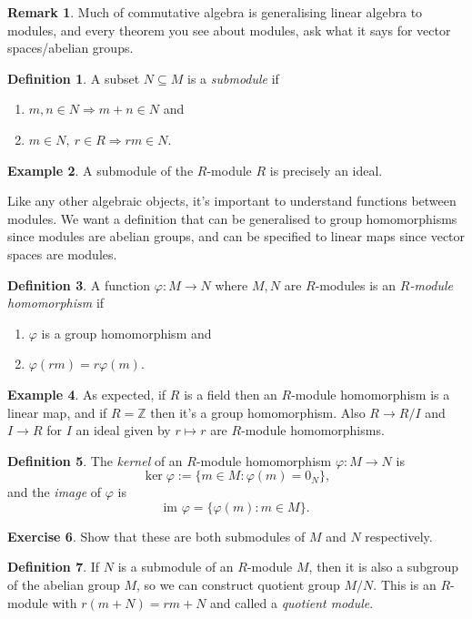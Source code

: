 \documentclass[a4paper]{article}
\newcommand{\Z}{\mathbb Z}
\newcommand{\im}{\text{im }}
\theoremstyle{definition}
\newtheorem{defn}{Definition}[subsection]
\newtheorem{example}[defn]{Example}
\newtheorem{exe}[defn]{Exercise}
\newtheorem*{remark}{Remark}
\begin{document}
\begin{remark}
Much of commutative algebra is generalising linear algebra to modules, and every theorem you see about modules, ask what it says for vector spaces/abelian groups. 
\end{remark}

\begin{defn}
A subset $N\subseteq M$ is a \textit{submodule} if
\begin{enumerate}
\item $m,n\in N\Rightarrow m+n\in N$ and
\item $m\in N,\ r\in R\Rightarrow rm\in N$.
\end{enumerate}
\end{defn}
\begin{example}
A submodule of the $R$-module $R$ is precisely an ideal.
\end{example}
Like any other algebraic objects, it's important to understand functions between modules. We want a definition that can be generalised to group homomorphisms since modules are abelian groups, and can be specified to linear maps since vector spaces are modules.
\begin{defn}
A function $\varphi:M\rightarrow N$ where $M,N$ are $R$-modules is an $R$\textit{-module homomorphism} if
\begin{enumerate}
\item $\varphi$ is a group homomorphism and
\item $\varphi(rm)=r\varphi(m)$.
\end{enumerate}
\end{defn}
\begin{example}
As expected, if $R$ is a field then an $R$-module homomorphism is a linear map, and if $R=\Z$ then it's a group homomorphism. Also $R\rightarrow R/I$ and $I\rightarrow R$ for $I$ an ideal given by $r\mapsto r$ are $R$-module homomorphisms.
\end{example}
\begin{defn}
The \textit{kernel} of an $R$-module homomorphism $\varphi:M\rightarrow N$ is
\[
\ker\varphi :=\{m\in M:\varphi(m)=0_N\},
\]
and the \textit{image} of $\varphi$ is
\[
\im \varphi=\{\varphi(m):m\in M\}.
\]
\end{defn}
\begin{exe}
Show that these are both submodules of $M$ and $N$ respectively.
\end{exe}

\begin{defn}
If $N$ is a submodule of an $R$-module $M$, then it is also a subgroup of the abelian group $M$, so we can construct quotient group $M/N$. This is an $R$-module with $r(m+N)=rm+N$ and called a \textit{quotient module}.
\end{defn}
\end{document}
